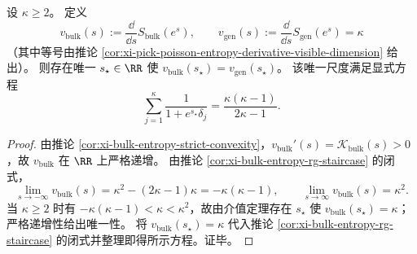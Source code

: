 \begin{proposition}\label{prop:xi-bulk-boundary-speed-matching}
设 \(\kappa\ge 2\)。
定义
\[
v_{\mathrm{bulk}}(s):=\frac{\dd}{\dd s}S_{\mathrm{bulk}}(e^s),
\qquad
v_{\mathrm{gen}}(s):=\frac{\dd}{\dd s}S_{\mathrm{gen}}(e^s)=\kappa
\]
（其中等号由推论 \ref{cor:xi-pick-poisson-entropy-derivative-visible-dimension} 给出）。
则存在唯一 \(s_\star\in\RR\) 使 \(v_{\mathrm{bulk}}(s_\star)=v_{\mathrm{gen}}(s_\star)\)。
该唯一尺度满足显式方程
\[
\boxed{\;
\sum_{j=1}^{\kappa}\frac{1}{1+e^{s_\star}\delta_j}=\frac{\kappa(\kappa-1)}{2\kappa-1}.\;}
\]
\end{proposition}
\begin{proof}
由推论 \ref{cor:xi-bulk-entropy-strict-convexity}，\(v_{\mathrm{bulk}}'(s)=\mathcal{K}_{\mathrm{bulk}}(s)>0\)，故 \(v_{\mathrm{bulk}}\) 在 \(\RR\) 上严格递增。
由推论 \ref{cor:xi-bulk-entropy-rg-staircase} 的闭式，
\[
\lim_{s\to-\infty}v_{\mathrm{bulk}}(s)=\kappa^2-(2\kappa-1)\kappa=-\kappa(\kappa-1),
\qquad
\lim_{s\to\infty}v_{\mathrm{bulk}}(s)=\kappa^2.
\]
当 \(\kappa\ge 2\) 时有 \(-\kappa(\kappa-1)<\kappa<\kappa^2\)，故由介值定理存在 \(s_\star\) 使 \(v_{\mathrm{bulk}}(s_\star)=\kappa\)；严格递增性给出唯一性。
将 \(v_{\mathrm{bulk}}(s_\star)=\kappa\) 代入推论 \ref{cor:xi-bulk-entropy-rg-staircase} 的闭式并整理即得所示方程。证毕。
\end{proof}

